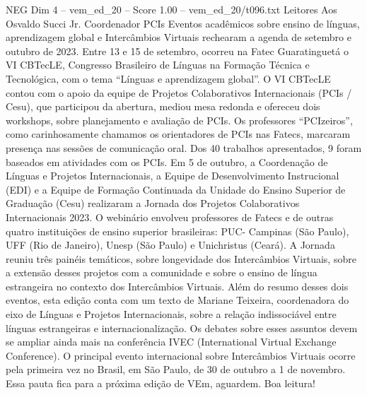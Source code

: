 \begin{textsample}{NEG Dim 4 – vem\_ed\_20 – Score 1.00 – vem\_ed\_20/t096.txt}  \label{ex:f4_neg_005}
Leitores Aos Osvaldo Succi Jr.
Coordenador PCIs Eventos acadêmicos sobre ensino de línguas, aprendizagem global e Intercâmbios Virtuais rechearam a agenda de setembro e outubro de 2023.
Entre 13 e 15 de setembro, ocorreu na Fatec Guaratinguetá o VI CBTecLE, Congresso Brasileiro de Línguas na Formação Técnica e Tecnológica, com o tema “Línguas e aprendizagem global”.
O VI CBTecLE contou com o apoio da equipe de Projetos Colaborativos Internacionais (PCIs / Cesu), que participou da abertura, mediou mesa redonda e ofereceu dois workshops, sobre planejamento e avaliação de PCIs.
Os professores “PCIzeiros”, como carinhosamente chamamos os orientadores de PCIs nas Fatecs, marcaram presença nas sessões de comunicação oral.
Dos 40 trabalhos apresentados, 9 foram baseados em atividades com os PCIs.
Em 5 de outubro, a Coordenação de Línguas e Projetos Internacionais, a Equipe de Desenvolvimento Instrucional (EDI) e a Equipe de Formação Continuada da Unidade do Ensino Superior de Graduação (Cesu) realizaram a Jornada dos Projetos Colaborativos Internacionais 2023.
O webinário envolveu professores de Fatecs e de outras quatro instituições de ensino superior brasileiras: PUC- Campinas (São Paulo), UFF (Rio de Janeiro), Unesp (São Paulo) e Unichristus (Ceará).
A Jornada reuniu três painéis temáticos, sobre longevidade dos Intercâmbios Virtuais, sobre a extensão desses projetos com a comunidade e sobre o ensino de língua estrangeira no contexto dos Intercâmbios Virtuais.
Além do resumo desses dois eventos, esta edição conta com um texto de Mariane Teixeira, coordenadora do eixo de Línguas e Projetos Internacionais, sobre a relação indissociável entre línguas estrangeiras e internacionalização.
Os debates sobre esses assuntos devem se ampliar ainda mais na conferência IVEC (International Virtual Exchange Conference).
O principal evento internacional sobre Intercâmbios Virtuais ocorre pela primeira vez no Brasil, em São Paulo, de 30 de outubro a 1 de novembro.
Essa pauta fica para a próxima edição de VEm, aguardem.
Boa leitura!

\end{textsample}
